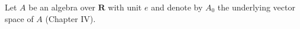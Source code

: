 Let $A$ be an algebra over $\mathbf{R}$ with unit $e$ and denote by $A_0$ the underlying vector space of $A$ (Chapter IV).
